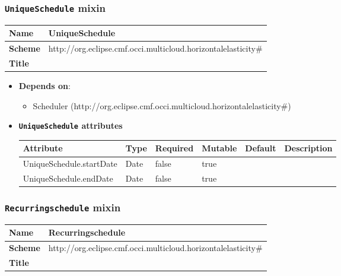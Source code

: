 
\subsubsection{\texttt{UniqueSchedule} mixin}
\begin{center}
\begin{tabular}{|l|l|}
  \hline
  \textbf{Name} & UniqueSchedule \\
  \hline  
  \textbf{Scheme} & http://org.eclipse.cmf.occi.multicloud.horizontalelasticity\# \\
  \hline
  \textbf{Title} &  \\
  \hline
\end{tabular}
\end{center}

\begin{itemize}
\item \textbf{Depends on}:
\begin{itemize}
	\item Scheduler (http://org.eclipse.cmf.occi.multicloud.horizontalelasticity\#)
\end{itemize}
\end{itemize}

\begin{itemize}
\item \textbf{\texttt{UniqueSchedule} attributes}

\begin{tabularx}{\textwidth}{|l|l|p{1.4cm}|p{1.3cm}|l|X|}
  \hline
  \textbf{Attribute} & \textbf{Type} & \textbf{Required} & \textbf{Mutable} & \textbf{Default} & \textbf{Description} \\
  \hline  
  UniqueSchedule.startDate & Date & false & true &  &  \\
  \hline
  UniqueSchedule.endDate & Date & false & true &  &  \\
  \hline
\end{tabularx}
\end{itemize}


 
\subsubsection{\texttt{Recurringschedule} mixin}
\begin{center}
\begin{tabular}{|l|l|}
  \hline
  \textbf{Name} & Recurringschedule \\
  \hline  
  \textbf{Scheme} & http://org.eclipse.cmf.occi.multicloud.horizontalelasticity\# \\
  \hline
  \textbf{Title} &  \\
  \hline
\end{tabular}
\end{center}


